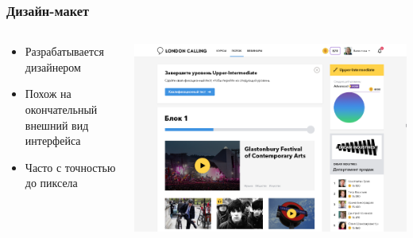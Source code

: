 \documentclass[xetex,mathserif,serif]{beamer}
\begin{document}
	\begin{frame}
		\frametitle{Дизайн-макет}
		\begin{columns}
			\begin{column}{0.4\textwidth}
				\begin{itemize}
					\item Разрабатывается дизайнером
					\item Похож на окончательный внешний вид интерфейса
					\item Часто с точностью до пиксела
				\end{itemize}
			\end{column}
			\begin{column}{0.6\textwidth}
				\begin{center}
					\includegraphics[width=\textwidth]{mockup.png}
				\end{center}
			\end{column}
		\end{columns}
	\end{frame}
\end{document}
